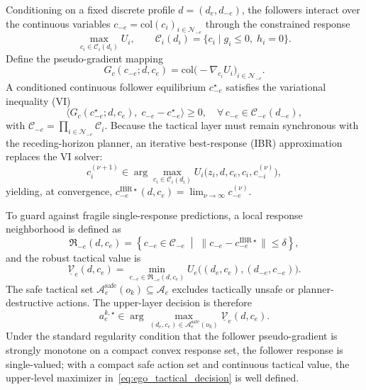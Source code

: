 \documentclass{iopjournal}
\begin{document}
Conditioning on a fixed discrete profile $d=(d_e,d_{-e})$, the followers
interact over the continuous variables
$c_{-e}=\mathrm{col}(c_i)_{i\in\mathcal{N}_{-e}}$ through the constrained
response
\begin{equation}
\max_{c_i\in\mathcal{C}_i(d_i)} U_i,\qquad
\mathcal{C}_i(d_i)=\{c_i\mid g_i\le0,\;h_i=0\}.
\label{eq:follower_response}
\end{equation}
Define the pseudo-gradient mapping
\begin{equation}
G_c(c_{-e};d,c_e)
=\mathrm{col}\!\bigl(
-\nabla_{c_i}U_i
\bigr)_{i\in\mathcal{N}_{-e}}.
\label{eq:pseudogradient}
\end{equation}
A conditioned continuous follower equilibrium $c_{-e}^\star$ satisfies the
variational inequality (VI)
\begin{equation}
\bigl\langle
G_c(c_{-e}^\star;d,c_e),\;c_{-e}-c_{-e}^\star
\bigr\rangle\ge0,
\quad\forall\,c_{-e}\in\mathcal{C}_{-e}(d_{-e}),
\label{eq:vi_equilibrium}
\end{equation}
with $\mathcal{C}_{-e}=\prod_{i\in\mathcal{N}_{-e}}\mathcal{C}_i$.
Because the tactical layer must remain synchronous with the
receding-horizon planner, an iterative best-response (IBR) approximation
replaces the VI solver:
\begin{equation}
c_i^{(\nu+1)}\in
\arg\max_{c_i\in\mathcal{C}_i(d_i)}
U_i\bigl(z_i,d,c_e,c_i,c_{-i}^{(\nu)}\bigr),
\label{eq:ibr_update}
\end{equation}
yielding, at convergence,
$c_{-e}^{\mathrm{IBR}\star}(d,c_e)=\lim_{\nu\to\infty}c_{-e}^{(\nu)}$.

To guard against fragile single-response predictions, a local response
neighborhood is defined as
\begin{equation}
\mathfrak{R}_{-e}(d,c_e)=
\left\{c_{-e}\in\mathcal{C}_{-e}
\;\middle|\;
\|c_{-e}-c_{-e}^{\mathrm{IBR}\star}\|\le\delta\right\},
\label{eq:response_neighborhood}
\end{equation}
and the robust tactical value is
\begin{equation}
\underline{\mathcal{V}}_e(d,c_e)=
\min_{c_{-e}\in\mathfrak{R}_{-e}(d,c_e)}
U_e\!\bigl((d_e,c_e),(d_{-e},c_{-e})\bigr).
\label{eq:robust_tactical_value}
\end{equation}
The safe tactical set
$\mathcal{A}_e^{\mathrm{safe}}(o_k)\subseteq\mathcal{A}_e$ excludes
tactically unsafe or planner-destructive actions.  The upper-layer decision
is therefore
\begin{equation}
a_e^{k,\star}\in
\arg\max_{(d_e,c_e)\in\mathcal{A}_e^{\mathrm{safe}}(o_k)}
\underline{\mathcal{V}}_e(d,c_e).
\label{eq:ego_tactical_decision}
\end{equation}
Under the standard regularity condition that the follower pseudo-gradient is
strongly monotone on a compact convex response set, the follower response is
single-valued; with a compact safe action set and continuous tactical value,
the upper-level maximizer in~\eqref{eq:ego_tactical_decision} is well defined.
\end{document}
